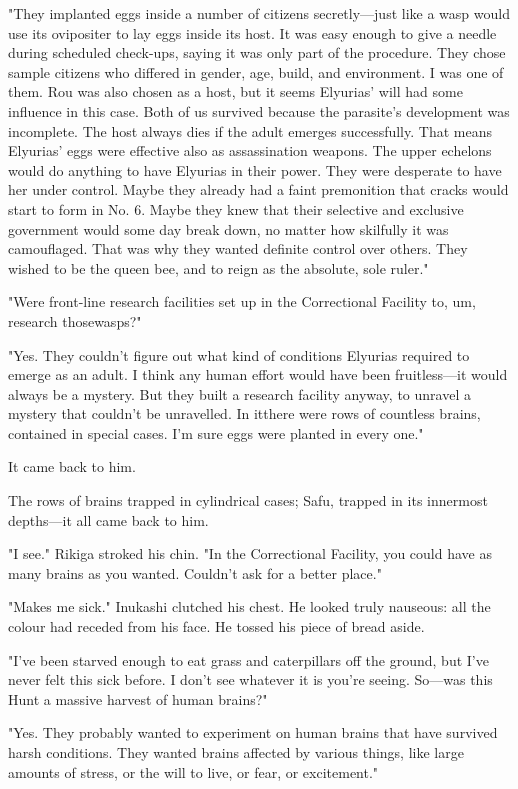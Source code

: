 "They implanted eggs inside a number of citizens secretly---just like a
wasp would use its ovipositer to lay eggs inside its host. It was easy
enough to give a needle during scheduled check-ups, saying it was only
part of the procedure. They chose sample citizens who differed in
gender, age, build, and environment. I was one of them. Rou was also
chosen as a host, but it seems Elyurias' will had some influence in this
case. Both of us survived because the parasite's development was
incomplete. The host always dies if the adult emerges successfully. That
means Elyurias' eggs were effective also as assassination weapons. The
upper echelons would do anything to have Elyurias in their power. They
were desperate to have her under control. Maybe they already had a faint
premonition that cracks would start to form in No. 6. Maybe they knew
that their selective and exclusive government would some day break down,
no matter how skilfully it was camouflaged. That was why they wanted
definite control over others. They wished to be the queen bee, and to
reign as the absolute, sole ruler."

"Were front-line research facilities set up in the Correctional Facility
to, um, research those\el wasps?"

"Yes. They couldn't figure out what kind of conditions Elyurias required
to emerge as an adult. I think any human effort would have been
fruitless---it would always be a mystery. But they built a research
facility anyway, to unravel a mystery that couldn't be unravelled. In
it\el there were rows of countless brains, contained in special cases.
I'm sure eggs were planted in every one."

It came back to him.

The rows of brains trapped in cylindrical cases; Safu, trapped in its
innermost depths---it all came back to him.

"I see." Rikiga stroked his chin. "In the Correctional Facility, you
could have as many brains as you wanted. Couldn't ask for a better
place."

"Makes me sick." Inukashi clutched his chest. He looked truly nauseous:
all the colour had receded from his face. He tossed his piece of bread
aside.

"I've been starved enough to eat grass and caterpillars off the ground,
but I've never felt this sick before. I don't see whatever it is you're
seeing. So---was this Hunt a massive harvest of human brains?"

"Yes. They probably wanted to experiment on human brains that have
survived harsh conditions. They wanted brains affected by various
things, like large amounts of stress, or the will to live, or fear, or
excitement."

